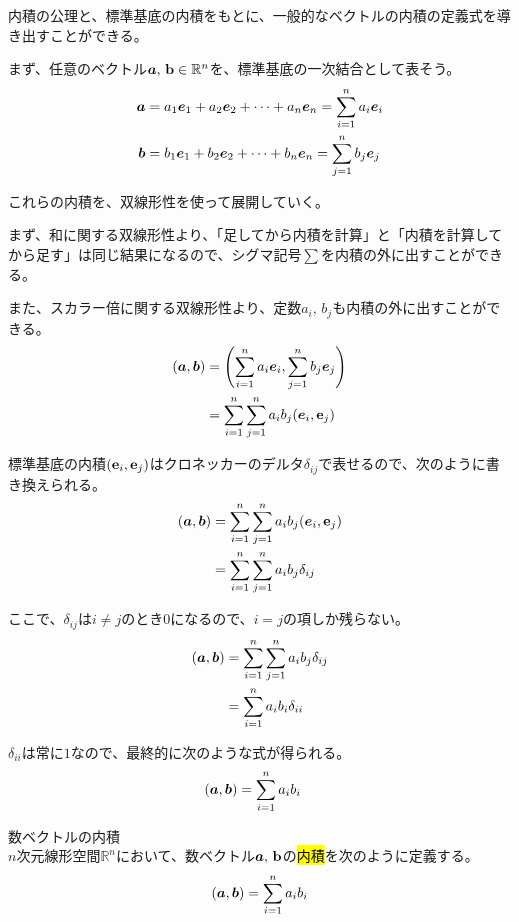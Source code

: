 \documentclass[../../imaging-math]{subfiles}
\begin{document}
内積の公理と、標準基底の内積をもとに、一般的なベクトルの内積の定義式を導き出すことができる。

\br

まず、任意のベクトル$\vb*{a},\, \vb{b} \in \mathbb{R}^n$を、標準基底の一次結合として表そう。
\begin{align*}
  \vb*{a} & = a_1 \vb*{e}_1 + a_2 \vb*{e}_2 + \cdots + a_n \vb*{e}_n = \sum_{i=1}^n a_i \vb*{e}_i \\
  \vb*{b} & = b_1 \vb*{e}_1 + b_2 \vb*{e}_2 + \cdots + b_n \vb*{e}_n = \sum_{j=1}^n b_j \vb*{e}_j
\end{align*}

これらの内積を、双線形性を使って展開していく。

まず、和に関する双線形性より、「足してから内積を計算」と「内積を計算してから足す」は同じ結果になるので、シグマ記号$\sum$を内積の外に出すことができる。

また、スカラー倍に関する双線形性より、定数$a_i, \, b_j$も内積の外に出すことができる。
\begin{align*}
  (\vb*{a}, \vb*{b}) & = \Biggl( \sum_{i=1}^n a_i \vb*{e}_i, \sum_{j=1}^n b_j \vb*{e}_j \Biggr) \\
                     & = \sum_{i=1}^n \sum_{j=1}^n a_i b_j (\vb*{e}_i, \vb{e}_j)
\end{align*}

標準基底の内積$(\vb{e}_i, \vb{e}_j)$はクロネッカーのデルタ$\delta_{ij}$で表せるので、次のように書き換えられる。
\begin{align*}
  (\vb*{a}, \vb*{b}) & = \sum_{i=1}^n \sum_{j=1}^n a_i b_j (\vb*{e}_i, \vb{e}_j) \\
                     & = \sum_{i=1}^n \sum_{j=1}^n a_i b_j \delta_{ij}
\end{align*}

ここで、$\delta_{ij}$は$i \neq j$のとき$0$になるので、$i = j$の項しか残らない。
\begin{align*}
  (\vb*{a}, \vb*{b}) & = \sum_{i=1}^n \sum_{j=1}^n a_i b_j \delta_{ij} \\
                     & = \sum_{i=1}^n a_i b_i \delta_{ii}
\end{align*}

$\delta_{ii}$は常に$1$なので、最終的に次のような式が得られる。
\begin{align*}
  (\vb*{a}, \vb*{b}) & = \sum_{i=1}^n a_i b_i
\end{align*}

\begin{definition}{数ベクトルの内積}\quad\\
  $n$次元線形空間$\mathbb{R}^n$において、数ベクトル$\vb*{a},\, \vb{b}$の\hl{内積}を次のように定義する。
  \Large
  \begin{equation*}
    (\vb*{a}, \vb*{b}) = \sum_{i=1}^n a_i b_i
  \end{equation*}
\end{definition}
\end{document}
